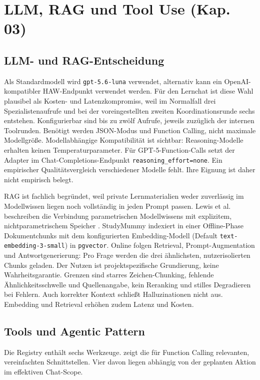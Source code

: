 \section{LLM, RAG und Tool Use (Kap. 03)}
\label{sec:llm-rag-tool-use}

\subsection{LLM- und RAG-Entscheidung}

Als Standardmodell wird \texttt{gpt-5.6-luna} verwendet, alternativ kann ein OpenAI-kompatibler HAW-Endpunkt
verwendet werden. Für den Lernchat ist diese Wahl plausibel als Kosten- und
Latenzkompromiss, weil im Normalfall drei Spezialistenaufrufe und bei der
voreingestellten zweiten Koordinationsrunde sechs entstehen. Konfigurierbar sind
bis zu zwölf Aufrufe, jeweils zuzüglich der internen Toolrunden. Benötigt werden
JSON-Modus und Function Calling, nicht
maximale Modellgröße. Modellabhängige Kompatibilität ist sichtbar: Reasoning-Modelle erhalten keinen
Temperaturparameter. Für GPT-5-Function-Calls setzt der Adapter im
Chat-Completions-Endpunkt \texttt{reasoning\_effort=none}. Ein empirischer Qualitätsvergleich verschiedener Modelle
fehlt. Ihre Eignung ist daher nicht empirisch belegt.

RAG ist fachlich begründet, weil private Lernmaterialien weder zuverlässig
im Modellwissen liegen noch vollständig in jeden Prompt passen. Lewis et al.
beschreiben die Verbindung parametrischen Modellwissens mit explizitem,
nichtparametrischem Speicher \parencite{lewisEtAl2020rag}. StudyMummy indexiert
in einer Offline-Phase Dokumentchunks mit dem konfigurierten Embedding-Modell
(Default \texttt{text-embedding-3-small}) in \texttt{pgvector}. Online folgen
Retrieval, Prompt-Augmentation und Antwortgenerierung: Pro Frage werden die drei
ähnlichsten, nutzerisolierten Chunks geladen. Der Nutzen ist
projektspezifische Grundierung, keine Wahrheitsgarantie. Grenzen sind starres
Zeichen-Chunking, fehlende Ähnlichkeitsschwelle und Quellenangabe, kein
Reranking und stilles Degradieren bei Fehlern. Auch korrekter Kontext schließt
Halluzinationen nicht aus. Embedding und Retrieval erhöhen zudem Latenz und
Kosten.

\subsection{Tools und Agentic Pattern}

Die Registry enthält sechs Werkzeuge.  zeigt die für Function
Calling relevanten, vereinfachten Schnittstellen. Vier davon liegen abhängig
von der geplanten Aktion im effektiven Chat-Scope.

